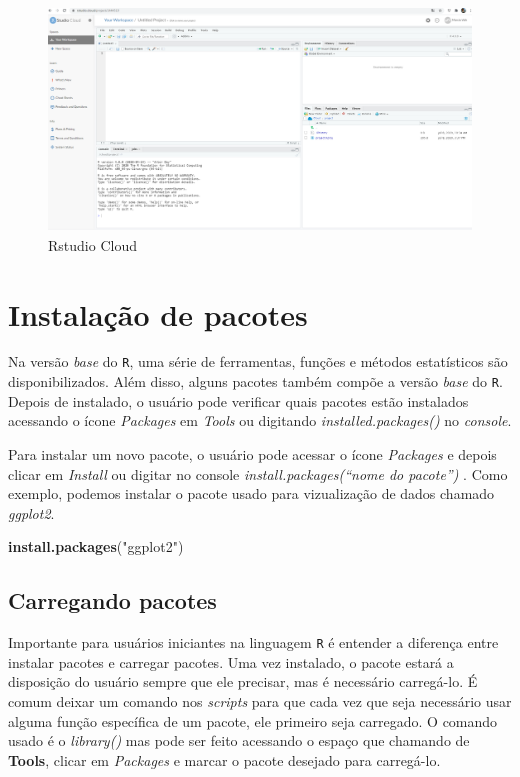 \documentclass[
]{book}
\newenvironment{Shaded}{\begin{snugshade}}{\end{snugshade}}
\newcommand{\KeywordTok}[1]{\textcolor[rgb]{0.13,0.29,0.53}{\textbf{#1}}}
\newcommand{\NormalTok}[1]{#1}
\newcommand{\StringTok}[1]{\textcolor[rgb]{0.31,0.60,0.02}{#1}}
\theoremstyle{definition}
\theoremstyle{definition}
\theoremstyle{definition}
\theoremstyle{remark}
\begin{document}
\begin{figure}
\includegraphics[width=0.9\linewidth]{Figuras/RStudioCloud2} \caption{Rstudio Cloud}\label{fig:rstudiocloud2}
\end{figure}

\hypertarget{instalauxe7uxe3o-de-pacotes}{%
\section{Instalação de pacotes}\label{instalauxe7uxe3o-de-pacotes}}

Na versão \emph{base} do \texttt{R}, uma série de ferramentas, funções e métodos estatísticos são disponibilizados. Além disso, alguns pacotes também compõe a versão \emph{base} do \texttt{R}. Depois de instalado, o usuário pode verificar quais pacotes estão instalados acessando o ícone \emph{Packages} em \emph{Tools} ou digitando \emph{installed.packages()} no \emph{console}.

Para instalar um novo pacote, o usuário pode acessar o ícone \emph{Packages} e depois clicar em \emph{Install} ou digitar no console \emph{install.packages(``nome do pacote'')} . Como exemplo, podemos instalar o pacote usado para vizualização de dados chamado \emph{ggplot2}.

\begin{Shaded}
\begin{Highlighting}[]
\KeywordTok{install.packages}\NormalTok{(}\StringTok{"ggplot2"}\NormalTok{)}
\end{Highlighting}
\end{Shaded}

\hypertarget{carregando-pacotes}{%
\subsection{Carregando pacotes}\label{carregando-pacotes}}

Importante para usuários iniciantes na linguagem \texttt{R} é entender a diferença entre instalar pacotes e carregar pacotes. Uma vez instalado, o pacote estará a disposição do usuário sempre que ele precisar, mas é necessário carregá-lo. É comum deixar um comando nos \emph{scripts} para que cada vez que seja necessário usar alguma função específica de um pacote, ele primeiro seja carregado. O comando usado é o \emph{library()} mas pode ser feito acessando o espaço que chamando de \textbf{Tools}, clicar em \emph{Packages} e marcar o pacote desejado para carregá-lo.
\end{document}
